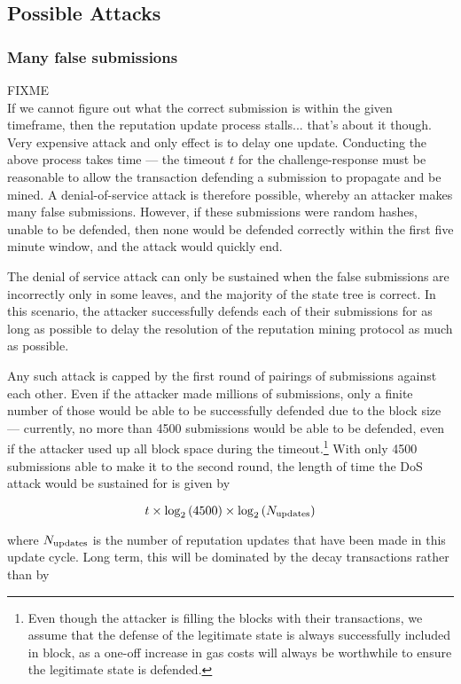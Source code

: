 \subsection{Possible Attacks}
\subsubsection*{Many false submissions}
FIXME\\ If we cannot figure out what the correct submission is within the given timeframe, then the reputation update process stalls... that's about it though. Very expensive attack and only effect is to delay one update.
Conducting the above process takes time --- the timeout $t$ for the challenge-response must be reasonable to allow the transaction defending a submission to propagate and be mined. A denial-of-service attack is therefore possible, whereby an attacker makes many false submissions. However, if these submissions were random hashes, unable to be defended, then none would be defended correctly within the first five minute window, and the attack would quickly end. 

The denial of service attack can only be sustained when the false submissions are incorrectly only in some leaves, and the majority of the state tree is correct. In this scenario, the attacker successfully defends each of their submissions for as long as possible to delay the resolution of the reputation mining protocol as much as possible.

Any such attack is capped by the first round of pairings of submissions against each other. Even if the attacker made millions of submissions, only a finite number of those would be able to be successfully defended due to the block size --- currently, no more than 4500 submissions would be able to be defended, even if the attacker used up all block space during the timeout.\footnote{Even though the attacker is filling the blocks with their transactions, we assume that the defense of the legitimate state is always successfully included in block, as a one-off increase in gas costs will always be worthwhile to ensure the legitimate state is defended. } With only 4500 submissions able to make it to the second round, the length of time the DoS attack would be sustained for is given by 

$$t \times \log_2\left(4500\right)\times \log_2\left(N_{\rm updates}\right)$$

where $N_{\rm updates}$ is the number of reputation updates that have been made in this update cycle. Long term, this will be dominated by the decay transactions rather than by 

